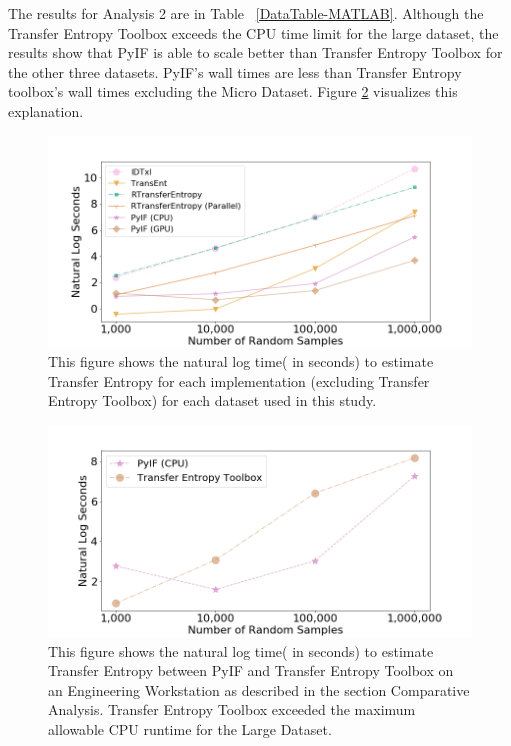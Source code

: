 \documentclass[conference]{IEEEtran}
\begin{document}
The results for Analysis 2 are in Table ~\ref{DataTable-MATLAB}. Although the Transfer Entropy Toolbox exceeds the CPU time limit for the large dataset, the results show that PyIF is able to scale better than Transfer Entropy Toolbox for the other three datasets. PyIF's wall times are less than Transfer Entropy toolbox's wall times excluding the Micro Dataset. Figure \ref{TE-walltime2} visualizes this explanation.


\begin{figure}
  \centerline{\includegraphics[scale=0.3]{figures/WallTime-TE.png}}
  \caption{This figure shows the natural log time( in seconds) to estimate Transfer Entropy for each implementation (excluding Transfer Entropy Toolbox) for each dataset used in this study. }
  \label{TE-walltime}
\end{figure}


\begin{figure}
  \centerline{\includegraphics[scale=0.3]{figures/WallTime-TE2.png}}
  \caption{This figure shows the natural log time( in seconds) to estimate Transfer Entropy between PyIF and Transfer Entropy Toolbox on an Engineering Workstation as described in the section Comparative Analysis. Transfer Entropy Toolbox exceeded the maximum allowable CPU runtime for the Large Dataset. }
  \label{TE-walltime2}
\end{figure}
\end{document}
